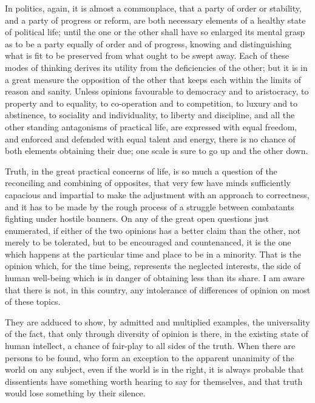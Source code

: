 In politics, again, it is almost a commonplace, that a party of order or stability, and a party of progress or reform, are both necessary elements of a healthy state of political life; until the one or the other shall have so enlarged its mental grasp as to be a party equally of order and of progress, knowing and distinguishing what is fit to be preserved from what ought to be swept away. Each of these modes of thinking derives its utility from the deficiencies of the other; but it is in a great measure the opposition of the other that keeps each within the limits of reason and sanity. Unless opinions favourable to democracy and to aristocracy, to property and to equality, to co-operation and to competition, to luxury and to abstinence, to sociality and individuality, to liberty and discipline, and all the other standing antagonisms of practical life, are expressed with equal freedom, and enforced and defended with equal talent and energy, there is no chance of both elements obtaining their due; one scale is sure to go up and the other down.\par

Truth, in the great practical concerns of life, is so much a question of the reconciling and combining of opposites, that very few have minds sufficiently capacious and impartial to make the adjustment with an approach to correctness, and it has to be made by the rough process of a struggle between combatants fighting under hostile banners. On any of the great open questions just enumerated, if either of the two opinions has a better claim than the other, not merely to be tolerated, but to be encouraged and countenanced, it is the one which happens at the particular time and place to be in a minority. That is the opinion which, for the time being, represents the neglected interests, the side of human well-being which is in danger of obtaining less than its share. I am aware that there is not, in this country, any intolerance of differences of opinion on most of these topics.\par

They are adduced to show, by admitted and multiplied examples, the universality of the fact, that only through diversity of opinion is there, in the existing state of human intellect, a chance of fair-play to all sides of the truth. When there are persons to be found, who form an exception to the apparent unanimity of the world on any subject, even if the world is in the right, it is always probable that dissentients have something worth hearing to say for themselves, and that truth would lose something by their silence.\par

